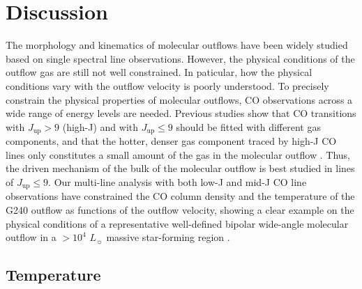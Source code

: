 \section{Discussion}\label{discussion}
The morphology and kinematics of molecular outflows have been widely studied based on single spectral line observations. However, the physical conditions of the outflow gas are still not well constrained. In paticular, how the physical conditions vary with the outflow velocity is poorly understood. To precisely constrain the physical properties of molecular outflows, CO observations across a wide range of energy levels are needed. Previous studies show that CO transitions with $J_{\mathrm{up}} > 9$ (high-J) and with $J_{\mathrm{up}} \le 9$ should be fitted with different gas components, and that the hotter, denser gas component traced by high-J CO lines only constitutes a small amount of the gas in the molecular outflow \citep{2013A&A...555A...8G, 2015A&A...581A...4L}. Thus, the driven mechanism of the bulk of the molecular outflow is best studied in lines of $J_{\mathrm{up}} \le 9$. Our multi-line analysis with both low-J and mid-J CO line observations have constrained the CO column density and the temperature of the G240 outflow as functions of the outflow velocity, showing a clear example on the physical conditions of a representative well-defined bipolar wide-angle molecular outflow in a $> 10^4$ $L_\sun$ massive star-forming region \citep{2009ApJ...696...66Q}.

\subsection{Temperature}

